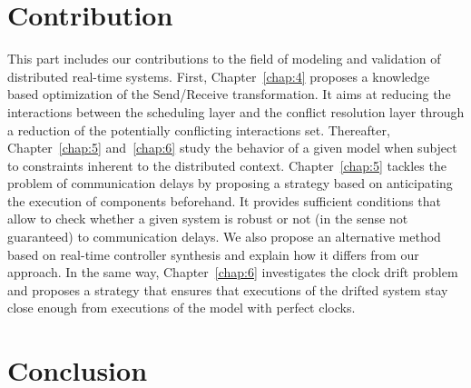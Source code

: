 \documentclass[a4paper,Times,twoside,index,12pt]{Classes/PhDThesisPSnPDF}
\begin{document}
\part{Contribution}
{This part includes our contributions to the field of modeling and validation of
distributed real-time systems. First, Chapter~\ref{chap:4} proposes a knowledge based
optimization of the Send/Receive transformation. It aims at reducing the interactions between
the scheduling layer and the conflict resolution layer through a reduction of the potentially
conflicting interactions set. Thereafter, Chapter~\ref{chap:5} and~\ref{chap:6} study the 
behavior of a given model when subject to constraints inherent to the distributed context.
Chapter~\ref{chap:5} tackles the problem of communication delays by proposing a strategy based
on anticipating the execution of components beforehand. It provides sufficient conditions
that allow to check whether a given system is robust or not (in the sense not guaranteed) 
to communication delays. We also propose an alternative method based on real-time controller
synthesis and explain how it differs from our approach. 
In the same way, Chapter~\ref{chap:6} investigates the clock drift problem and proposes a 
strategy that ensures that executions of the drifted system stay close enough from 
executions of the model with perfect clocks.
}




%
\part{Conclusion}
{}

\listoffigures 

\listoftables 



\begin{spacing}{0.9}



\cleardoublepage




\end{spacing}
\end{document}

